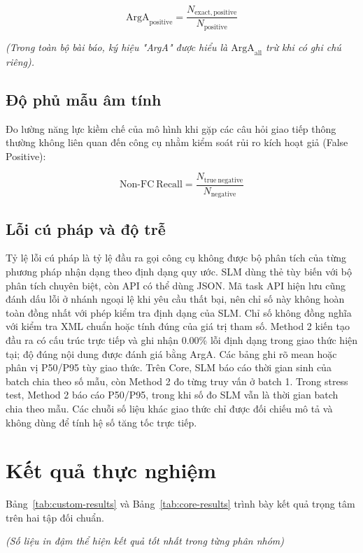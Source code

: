 \documentclass[10pt,twocolumn,a4paper]{article}
\begin{document}
$$\mathrm{ArgA}_{\mathrm{positive}} = \frac{N_{\mathrm{exact, positive}}}{N_{\mathrm{positive}}}$$

\textit{(Trong toàn bộ bài báo, ký hiệu "ArgA" được hiểu là $\mathrm{ArgA}_{\mathrm{all}}$ trừ khi có ghi chú riêng).}

\subsection{Độ phủ mẫu âm tính}
Đo lường năng lực kiềm chế của mô hình khi gặp các câu hỏi giao tiếp thông thường không liên quan đến công cụ nhằm kiểm soát rủi ro kích hoạt giả (False Positive):

$$\mathrm{Non\text{-}FC\ Recall} = \frac{N_{\mathrm{true\ negative}}}{N_{\mathrm{negative}}}$$

\subsection{Lỗi cú pháp và độ trễ}
Tỷ lệ lỗi cú pháp là tỷ lệ đầu ra gọi công cụ không được bộ phân tích của từng phương pháp nhận dạng theo định dạng quy ước. SLM dùng thẻ tùy biến với bộ phân tích chuyên biệt, còn API có thể dùng JSON. Mã task API hiện lưu cũng đánh dấu lỗi ở nhánh ngoại lệ khi yêu cầu thất bại, nên chỉ số này không hoàn toàn đồng nhất với phép kiểm tra định dạng của SLM. Chỉ số không đồng nghĩa với kiểm tra XML chuẩn hoặc tính đúng của giá trị tham số. Method 2 kiến tạo đầu ra có cấu trúc trực tiếp và ghi nhận 0.00\% lỗi định dạng trong giao thức hiện tại; độ đúng nội dung được đánh giá bằng ArgA. Các bảng ghi rõ mean hoặc phân vị P50/P95 tùy giao thức. Trên Core, SLM báo cáo thời gian sinh của batch chia theo số mẫu, còn Method 2 đo từng truy vấn ở batch 1. Trong stress test, Method 2 báo cáo P50/P95, trong khi số đo SLM vẫn là thời gian batch chia theo mẫu. Các chuỗi số liệu khác giao thức chỉ được đối chiếu mô tả và không dùng để tính hệ số tăng tốc trực tiếp.


\section{Kết quả thực nghiệm}

Bảng~\ref{tab:custom-results} và Bảng~\ref{tab:core-results} trình bày kết quả trọng tâm trên hai tập đối chuẩn.

\textit{(Số liệu in đậm thể hiện kết quả tốt nhất trong từng phân nhóm)}
\end{document}
